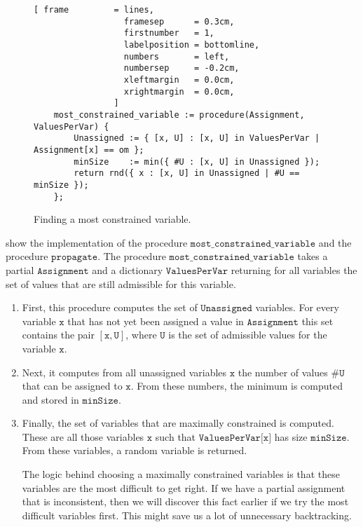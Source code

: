 \begin{figure}[!ht]
\centering
\begin{Verbatim}[ frame         = lines, 
                  framesep      = 0.3cm, 
                  firstnumber   = 1,
                  labelposition = bottomline,
                  numbers       = left,
                  numbersep     = -0.2cm,
                  xleftmargin   = 0.0cm,
                  xrightmargin  = 0.0cm,
                ]
    most_constrained_variable := procedure(Assignment, ValuesPerVar) {
        Unassigned := { [x, U] : [x, U] in ValuesPerVar | Assignment[x] == om };
        minSize    := min({ #U : [x, U] in Unassigned });
        return rnd({ x : [x, U] in Unassigned | #U == minSize });
    };
\end{Verbatim}
\vspace*{-0.3cm}
\caption{Finding a most constrained variable.}
\label{fig:csp-constraint-propagation.stlx-2}
\end{figure}
 show the implementation of the procedure $\texttt{most\_constrained\_variable}$
and the procedure $\texttt{propagate}$.  The procedure $\texttt{most\_constrained\_variable}$ takes a partial
$\texttt{Assignment}$ and a dictionary $\texttt{ValuesPerVar}$ returning for all variables the set of values
that are still admissible for this variable.
\begin{enumerate}
\item First, this procedure computes the set of $\texttt{Unassigned}$ variables.  For every variable $\texttt{x}$ that
      has not yet been assigned a value in $\texttt{Assignment}$ this set contains the pair 
      $[\texttt{x}, \texttt{U}]$, where $\texttt{U}$ is the set of admissible values for the variable  $\texttt{x}$.
\item Next, it computes from all unassigned variables $\texttt{x}$ the number of values $\texttt{\#U}$ 
      that can be assigned to $\texttt{x}$.  From these numbers, the minimum is computed and stored in $\texttt{minSize}$.  
\item Finally, the set of variables that are maximally constrained is computed.  These are all those variables
      $\texttt{x}$ such that $\texttt{ValuesPerVar[x]}$ has size $\texttt{minSize}$.  From these variables, a random 
      variable is returned.
      
      The logic behind choosing a maximally constrained variables is that these variables are the most
      difficult to get right.  If we have a partial assignment that is inconsistent, then we will discover this
      fact earlier if we try the most difficult variables first.  This might save us a lot of unnecessary
      backtracking. 
\end{enumerate}

